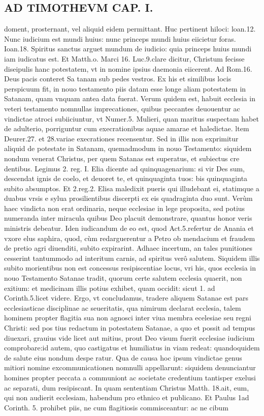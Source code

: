 \documentclass{article}
\begin{document}
\begin{pages}
\section*{AD TIMOTHEVM CAP. I. }
\marginpar{[ p.63 ]}\pstart doment, prosternant, vel aliquid eidem permittant. Huc pertinent hiloci: loan.12. Nunc iudicium est mundi huius: nunc princeps mundi huius eiicietur foras. Ioan.18. Spiritus sanctus arguet mundum de iudicio: quia princeps huius mundi iam iudicatus est. Et Matth.o. Marci 16. Luc.9.clare dicitur, Christum fecisse diseipulis hanc potestatem, vt in nomine ipsius daemonia eiicerent. Ad Rom.16. Deus pacis conteret Sa tanam sub pedes vestros. Ex his et similibus locis perspicuum fit, in nouo testamento piis datam esse longe aliam potestatem in Satanam, quam vnquam antea data fuerat. Verum quidem est, habuit ecclesia in veteri testamento nomnullas imprecationes, quibus peccantes deuouentur ac vindictae atroci subiiciuntur, vt Numer.5. Mulieri, quan maritus suspectam habet de adulterio, porriguntur cum execrationibus aquae amarae et haledictae. ltem Deurer.27. et 28.variae execrationes recensentur. Sed in illis non exprimitur aliquid de potestate in Satanam, quemadmodum in nouo Testamento: siquidem nondum venerat Christus, per quem Satanas est superatus, et subiectus cre dentibus. Legimus 2. reg. I. Elia dicente ad quinquagenarium: si vir Des sum, descendat ignis de coelo, et deuoret te, et quinquaginta tuos: bis quinquaginta subito absumptos. Et 2.reg.2. Elisa maledixit pueris qui illudebant ei, statimque  a duabus  vrsis e sylua prosilientibus  discerpti ex eis quadraginta duo sunt. Verùm haec vindicta non erat ordinaria, neque  ecclesiae in lege proposita, sed potius numeranda inter miracula quibus Deo placuit demonstrare, quantus honor veris ministris debeatur. Iden iudicandum de eo est, quod Act.5.refertur de Anania et vxore elus saphira, quod, cùm redarguerentur a Petro ob mendacium et fraudem de pretio agri diuenditi, subito expirarint. Adhaec incertum, an tales punitiones cesserint tantummodo ad interitum carnis, ad spiritus verô salutem. Siquidem illis subito morientibus non est concessus resipiscentiae locus, vri his, quos ecclesia in nouo Testamento Satanae tradit, quorum certe salutem ecclesia quaerit, non exitium: et medicinam illis potius exhibet, quam occidit: sicut 1. ad Corinth.5.licet videre. Ergo, vt concludamus, tradere aliquem Satanae est pars ecclesiasticae disciplinae ac seueritatis, qua nimirum declarat ecclesia, talem hominem propter flagitia sua non agnosci inter viua membra ecelesiae seu regni Christi: sed pos tius redactum in potestatem Satanae, a quo et possit ad tempus diuexari, grauius vide licet aut mitius, prout Deo visum fuerit ecclesiae iudicium comprobare:id autem, quo castigatus et humiliatus in viam redeat: quandoquidem de salute eius nondum despe ratur. Qua de causa hoc ipsum vindictae genus mitiori nomine excommunicationen nomnulli appellarunt: siquidem denunciantur homines propter peccata a communiont ac societate credentium tantisper exelusi ac separati, dum resipiscant. In quam sententiam Christus Matth. 18.ait, eum, qui non audierit ecclesiam, habendum pro ethnico et publicano. Et Paulus 1ad Corinth. 5. prohibet piis, ne cum flagitiosis commisceantur: ac ne cibum 
\end{pages}
\end{document}
